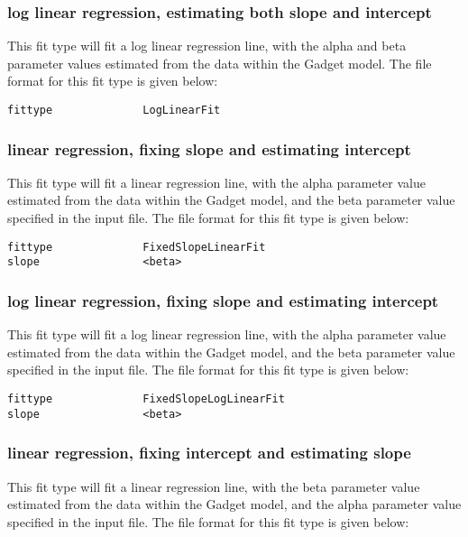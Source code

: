 \documentclass [a4paper, 10pt]{book}
\begin{document}
\subsubsection{log linear regression, estimating both slope and intercept}
This fit type will fit a log linear regression line, with the alpha and beta parameter values estimated from the data within the Gadget model.  The file format for this fit type is given below:

\begin{verbatim}
fittype              LogLinearFit
\end{verbatim}

\subsubsection{linear regression, fixing slope and estimating intercept}
This fit type will fit a linear regression line, with the alpha parameter value estimated from the data within the Gadget model, and the beta parameter value specified in the input file.  The file format for this fit type is given below:

\begin{verbatim}
fittype              FixedSlopeLinearFit
slope                <beta>
\end{verbatim}

\subsubsection{log linear regression, fixing slope and estimating intercept}
This fit type will fit a log linear regression line, with the alpha parameter value estimated from the data within the Gadget model, and the beta parameter value specified in the input file.  The file format for this fit type is given below:

\begin{verbatim}
fittype              FixedSlopeLogLinearFit
slope                <beta>
\end{verbatim}

\subsubsection{linear regression, fixing intercept and estimating slope}
This fit type will fit a linear regression line, with the beta parameter value estimated from the data within the Gadget model, and the alpha parameter value specified in the input file.  The file format for this fit type is given below:
\end{document}
